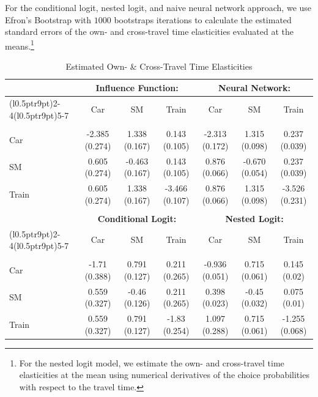 \documentclass[a4paper, 12pt]{article}
\begin{document}
For the conditional logit, nested logit, and naive neural network approach, we use Efron's Bootstrap \cite{efron1979} with $1000$ bootstraps iterations to calculate the estimated standard errors of the own- and cross-travel time elasticities evaluated at the means.\footnote{For the nested logit model, we estimate the own- and cross-travel time elasticities at the mean using numerical derivatives of the choice probabilities with respect to the travel time. }
\begin{table}[H] 
\centering 
\small
\captionsetup{justification=centering}
\caption{Estimated Own- \& Cross-Travel Time Elasticities} 
  \label{tab:elasticitiesSmall} \small 
 \tabcolsep=0.15cm 
\begin{tabular}{lcccccc}
  \toprule \noalign{\smallskip}
&  \multicolumn{3}{c}{\textbf{Influence Function:}} & \multicolumn{3}{c}{\textbf{Neural Network:}} \\
 \cmidrule(l{0.5pt}r{9pt}){2-4}\cmidrule(l{0.5pt}r{9pt}){5-7}
  & Car & SM & Train & Car & SM & Train \\ [0.2ex] 
  \hline \\ [-2ex] 
Car & -2.385 \scriptsize{(0.274)} & 1.338 \scriptsize{(0.167)} & 0.143 \scriptsize{(0.105)} & -2.313 \scriptsize{(0.172)} & 1.315 \scriptsize{(0.098)} & 0.237 \scriptsize{(0.039)} \\ [0.5ex] 
 SM & 0.605 \scriptsize{(0.274)} & -0.463 \scriptsize{(0.167)} & 0.143 \scriptsize{(0.105)} & 0.876 \scriptsize{(0.066}) & -0.670 \scriptsize{(0.054}) & 0.237 \scriptsize{(0.039)} \\ [0.5ex] 
 Train & 0.605 \scriptsize{(0.274)} & 1.338 \scriptsize{(0.167)} & -3.466 \scriptsize{(0.107}) & 0.876 \scriptsize{(0.066)} & 1.315 \scriptsize{(0.098)} & -3.526 \scriptsize{(0.231)}  \\ [0.5ex] 
\hline \\ 

& \multicolumn{3}{c}{\textbf{Conditional Logit:}} & \multicolumn{3}{c}{\textbf{Nested Logit:}} \\
 \cmidrule(l{0.5pt}r{9pt}){2-4}\cmidrule(l{0.5pt}r{9pt}){5-7}
   & Car & SM & Train & Car & SM & Train\\ [0.2ex] \hline \\ [-2ex] 
Car & -1.71 \scriptsize{(0.388)} & 0.791 \scriptsize{(0.127)} & 0.211 \scriptsize{(0.265)} &  -0.936 \scriptsize{(0.051)} & 0.715 \scriptsize{(0.061)} & 0.145 \scriptsize{(0.02)}  \\ [0.25ex]
 SM &0.559 \scriptsize{(0.327)} & -0.46 \scriptsize{(0.126)} & 0.211 \scriptsize{(0.265)}  & 0.398 \scriptsize{(0.023)} & -0.45 \scriptsize{(0.032)} &  0.075 \scriptsize{(0.01)}  \\ [0.25ex]
 Train & 0.559 \scriptsize{(0.327)} & 0.791 \scriptsize{(0.127)} & -1.83 \scriptsize{(0.254)} &  1.097 \scriptsize{(0.288)} &  0.715 \scriptsize{(0.061)} & -1.255 \scriptsize{(0.068)}  \\ [0.25ex]


\end{tabular}
\end{table}
\end{document}
